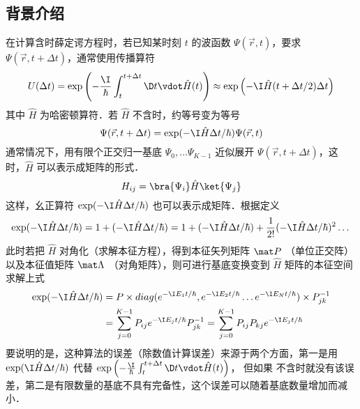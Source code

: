 \subsection{背景介绍}

在计算含时薛定谔方程时，若已知某时刻 $t$ 的波函数 $\Psi(\vec r,t)$，要求 $\Psi(\vec r,t+\Delta t)$，通常使用传播算符 %
 \begin{equation}
U(\Delta t) = \exp\left( -\frac{\I}{\hbar} \int_{t}^{t+\Delta t} \D t\vdot \hat H(t) \right)
\approx \exp\left(-\I\hat H(t+\Delta t/2) \Delta t \right)
\end{equation}
其中 $\hat H$ 为哈密顿算符．若 $\hat H$ 不含时，约等号变为等号
\begin{equation}
\Psi(\vec r, t+\Delta t) = \exp(-\I\hat H\Delta t/\hbar)\Psi(\vec r, t)
\end{equation}
通常情况下，用有限个正交归一基底 $\Psi_0,\dots\Psi_{K-1}$ 近似展开 $\Psi(\vec r,t+\Delta t)$，这时，$\hat H$ 可以表示成矩阵的形式．
\begin{equation}
H_{ij} = \bra{\Psi_i} \hat H \ket{\Psi_j}
\end{equation}
这样，幺正算符 $\exp(-\I\hat H\Delta t/\hbar)$ 也可以表示成矩阵．根据定义 %
\begin{equation}
\exp(-\I\hat H\Delta t/\hbar) = 1+(-\I\hat H\Delta t/\hbar) = 1+(-\I\hat H\Delta t/\hbar) + \frac{1}{2!}(-\I\hat H\Delta t/\hbar)^2\dots
\end{equation}
此时若把 $\hat H$ 对角化（求解本征方程），得到本征矢列矩阵 $\mat P$ （单位正交阵）以及本征值矩阵 $\mat \Lambda$ （对角矩阵），则可进行基底变换变到 $\hat H$ 矩阵的本征空间求解上式 %
\begin{equation}\begin{aligned}
\exp(-\I\hat H\Delta t/\hbar) &= P\times diag(e^{-\I E_1 t/\hbar},e^{-\I E_2 t/\hbar}\dots e^{-\I E_N t/\hbar})\times P_{jk}^{-1}\\
&= \sum_{j=0}^{K-1} P_{ij} e^{-\I E_j t/\hbar} P_{jk}^{-1}
= \sum_{j=0}^{K-1} P_{ij}P_{kj} e^{-\I E_j t/\hbar} 
\end{aligned}\end{equation}
要说明的是，这种算法的误差（除数值计算误差）来源于两个方面，第一是用 $\exp(\I\hat H\Delta t/\hbar)$ 代替 $\exp\left( -\frac{\I}{\hbar} \int_{t}^{t+\Delta t} \D t\vdot \hat H(t) \right)$， 但如果 不含时就没有该误差，第二是有限数量的基底不具有完备性，这个误差可以随着基底数量增加而减小．

